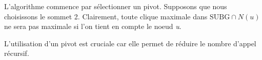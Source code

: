 \documentclass[12pt,a4paper]{article}
\begin{document}
L'algorithme commence par sélectionner un pivot. Supposons que nous choisissons le sommet 2.
Clairement, toute clique maximale dans \(\text{SUBG} \cap N(u)\) ne sera pas maximale si l'on tient en compte le noeud \emph{u}.

L'utilisation d'un pivot est cruciale car elle permet de réduire le nombre d'appel récursif.
%




\end{document}
